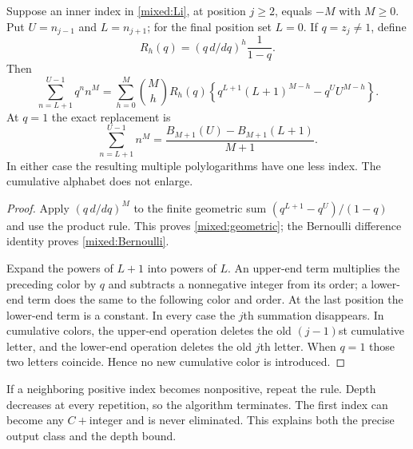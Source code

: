 \begin{lemma}
\label{mixed:eliminate}
Suppose an inner index in \eqref{mixed:Li}, at position $j\ge2$,
equals $-M$ with $M\ge0$. Put $U=n_{j-1}$ and $L=n_{j+1}$;
for the final position set $L=0$. If $q=z_j\ne1$, define
\[
 R_h(q)=(q\,d/dq)^h\frac1{1-q}.
\]
Then
\begin{equation}\label{mixed:geometric}
 \sum_{n=L+1}^{U-1}q^n n^M
 =\sum_{h=0}^M\binom Mh R_h(q)
       \left\{q^{L+1}(L+1)^{M-h}-q^U U^{M-h}\right\}.
\end{equation}
At $q=1$ the exact replacement is
\begin{equation}\label{mixed:Bernoulli}
 \sum_{n=L+1}^{U-1}n^M
       =\frac{B_{M+1}(U)-B_{M+1}(L+1)}{M+1}.
\end{equation}
In either case the resulting multiple polylogarithms have one less
index. The cumulative alphabet does not enlarge.
\end{lemma}
\begin{proof}
Apply $(q\,d/dq)^M$ to the finite geometric sum
$(q^{L+1}-q^U)/(1-q)$ and use the product rule. This proves
\eqref{mixed:geometric}; the Bernoulli difference identity proves
\eqref{mixed:Bernoulli}.

Expand the powers of $L+1$ into powers of $L$. An upper-end term
multiplies the preceding color by $q$ and subtracts a nonnegative
integer from its order; a lower-end term does the same to the following
color and order. At the last position the lower-end term is a constant.
In every case the $j$th summation disappears. In cumulative colors,
the upper-end operation deletes the old $(j-1)$st cumulative letter,
and the lower-end operation deletes the old $j$th letter. When $q=1$
those two letters coincide. Hence no new cumulative color is introduced.
\end{proof}

If a neighboring positive index becomes nonpositive, repeat the rule.
Depth decreases at every repetition, so the algorithm terminates.
The first index can become any $C+$integer and is never eliminated.
This explains both the precise output class and the depth bound.

